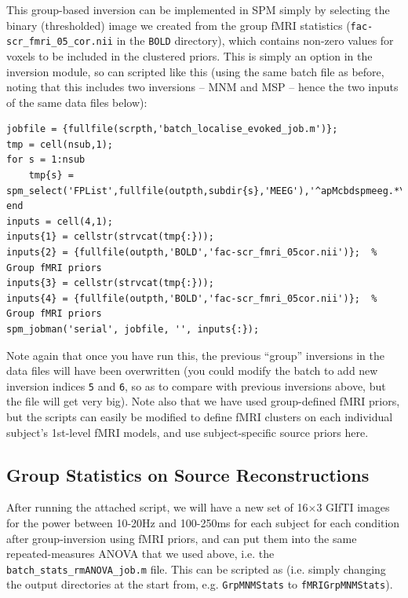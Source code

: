 This group-based inversion can be implemented in SPM simply by selecting the binary (thresholded) image we created from the group fMRI statistics (\texttt{fac-scr\_fmri\_05\_cor.nii} in the \texttt{BOLD} directory), which contains non-zero values for voxels to be included in the clustered priors. This is simply an option in the inversion module, so can scripted like this (using the same batch file as before, noting that this includes two inversions -- MNM and MSP -- hence the two inputs of the same data files below):

\begin{lstlisting}[style=Matlab-editor,basicstyle=\mlttfamily\footnotesize]
jobfile = {fullfile(scrpth,'batch_localise_evoked_job.m')};
tmp = cell(nsub,1);
for s = 1:nsub
    tmp{s} = spm_select('FPList',fullfile(outpth,subdir{s},'MEEG'),'^apMcbdspmeeg.*\.mat');
end
inputs = cell(4,1);
inputs{1} = cellstr(strvcat(tmp{:}));
inputs{2} = {fullfile(outpth,'BOLD','fac-scr_fmri_05cor.nii')};  % Group fMRI priors
inputs{3} = cellstr(strvcat(tmp{:}));
inputs{4} = {fullfile(outpth,'BOLD','fac-scr_fmri_05cor.nii')};  % Group fMRI priors
spm_jobman('serial', jobfile, '', inputs{:});
\end{lstlisting}

Note again that once you have run this, the previous ``group'' inversions in the data files will have been overwritten (you could modify the batch to add new inversion indices \texttt{5} and \texttt{6}, so as to compare with previous inversions above, but the file will get very big). Note also that we have used group-defined fMRI priors, but the scripts can easily be modified to define fMRI clusters on each individual subject's 1st-level fMRI models, and use subject-specific source priors here.

\subsection{Group Statistics on Source Reconstructions}

After running the attached script, we will have a new set of 16\(\times\)3 GIfTI images for the power between 10-20Hz and 100-250ms for each subject for each condition after group-inversion using fMRI priors, and can put them into the same repeated-measures ANOVA that we used above, i.e. the \texttt{batch\_stats\_rmANOVA\_job.m} file. This can be scripted as (i.e. simply changing the output directories at the start from, e.g. \texttt{GrpMNMStats} to \texttt{fMRIGrpMNMStats}).

